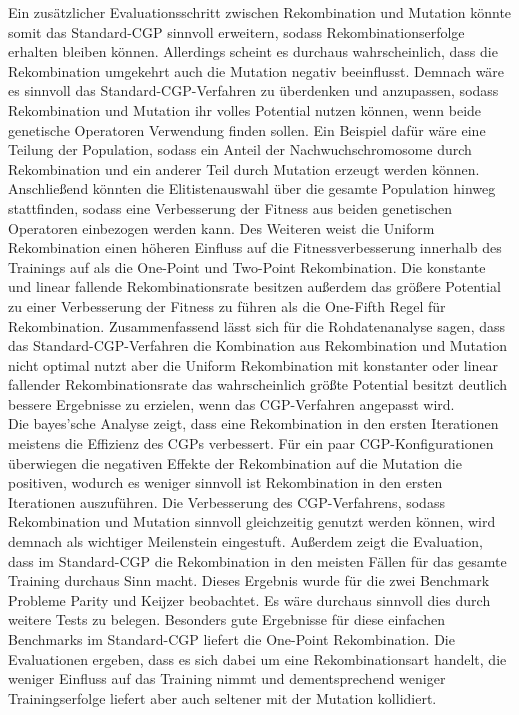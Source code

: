 Ein zusätzlicher Evaluationsschritt zwischen Rekombination und Mutation könnte somit das Standard-CGP sinnvoll erweitern, sodass Rekombinationserfolge erhalten bleiben können.
Allerdings scheint es durchaus wahrscheinlich, dass die Rekombination umgekehrt auch die Mutation negativ beeinflusst.
Demnach wäre es sinnvoll das Standard-CGP-Verfahren zu überdenken und anzupassen, sodass Rekombination und Mutation ihr volles Potential nutzen können, wenn beide genetische Operatoren Verwendung finden sollen.
Ein Beispiel dafür wäre eine Teilung der Population, sodass ein Anteil der Nachwuchschromosome durch Rekombination und ein anderer Teil durch Mutation erzeugt werden können.
Anschließend könnten die Elitistenauswahl über die gesamte Population hinweg stattfinden, sodass eine Verbesserung der Fitness aus beiden genetischen Operatoren einbezogen werden kann.
Des Weiteren weist die Uniform Rekombination einen höheren Einfluss auf die Fitnessverbesserung innerhalb des Trainings auf als die One-Point und Two-Point Rekombination.
Die konstante und linear fallende Rekombinationsrate besitzen außerdem das größere Potential zu einer Verbesserung der Fitness zu führen als die One-Fifth Regel für Rekombination.
Zusammenfassend lässt sich für die Rohdatenanalyse sagen, dass das Standard-CGP-Verfahren die Kombination aus Rekombination und Mutation nicht optimal nutzt aber die Uniform Rekombination mit konstanter oder linear fallender Rekombinationsrate das wahrscheinlich größte Potential besitzt deutlich bessere Ergebnisse zu erzielen, wenn das CGP-Verfahren angepasst wird.\\
Die bayes'sche Analyse zeigt, dass eine Rekombination in den ersten Iterationen meistens die Effizienz des CGPs verbessert.
Für ein paar CGP-Konfigurationen überwiegen die negativen Effekte der Rekombination auf die Mutation die positiven, wodurch es weniger sinnvoll ist Rekombination in den ersten Iterationen auszuführen.
Die Verbesserung des CGP-Verfahrens, sodass Rekombination und Mutation sinnvoll gleichzeitig genutzt werden können, wird demnach als wichtiger Meilenstein eingestuft.
Außerdem zeigt die Evaluation, dass im Standard-CGP die Rekombination in den meisten Fällen für das gesamte Training durchaus Sinn macht.
Dieses Ergebnis wurde für die zwei Benchmark Probleme Parity und Keijzer beobachtet.
Es wäre durchaus sinnvoll dies durch weitere Tests zu belegen.
Besonders gute Ergebnisse für diese einfachen Benchmarks im Standard-CGP liefert die One-Point Rekombination.
Die Evaluationen ergeben, dass es sich dabei um eine Rekombinationsart handelt, die weniger Einfluss auf das Training nimmt und dementsprechend weniger Trainingserfolge liefert aber auch seltener mit der Mutation kollidiert.
